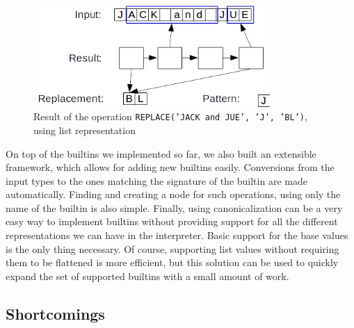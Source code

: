 \documentclass[twoside,11pt,a4paper]{article}
\newcommand{\pls}[1]{\small\texttt{#1}\normalsize}
\begin{document}
\begin{figure}[h]
	\centering
	\includegraphics[width=9cm]{./graphs/ReplacementExample.png}
	\caption{Result of the operation \pls{REPLACE('JACK and JUE', 'J', 'BL')}, using list representation}
	\label{fig:replaceexample}
\end{figure}

On top of the builtins we implemented so far, we also built an extensible framework, which allows for adding new builtins easily. Conversions from the input types to the ones matching the signature of the builtin are made automatically. Finding and creating a node for such operations, using only the name of the builtin is also simple. Finally, using canonicalization can be a very easy way to implement builtins without providing support for all the different representations we can have in the interpreter. Basic support for the base values is the only thing necessary. Of course, supporting list values without requiring them to be flattened is more efficient, but this solution can be used to quickly expand the set of supported builtins with a small amount of work.

\subsection{Shortcomings}


\end{document}
